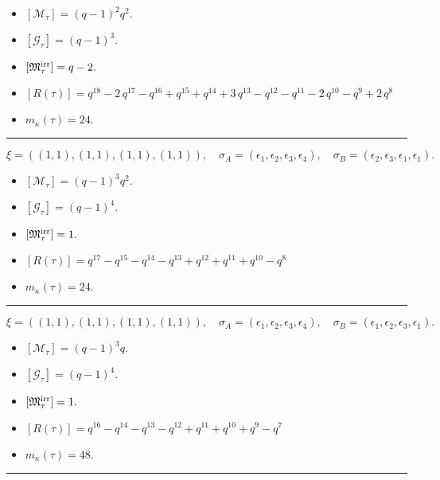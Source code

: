 \documentclass[10pt,a4paper]{amsart}
\begin{document}
\begin{itemize}
 \item $[\mathcal{M}_{\tau}] = {\left(q - 1\right)}^{2} q^{2} .$

 \item $[\mathcal{G}_{\tau}] = {\left(q - 1\right)}^{3} .$

 \item $[{\frak M}_{\tau}^{\textrm{irr}}] = q - 2 .$

 \item $[R(\tau)] = q^{18} - 2 \, q^{17} - q^{16} + q^{15} + q^{14} + 3 \, q^{13} - q^{12} - q^{11} - 2 \, q^{10} - q^{9} + 2 \, q^{8} $

 \item $m_{\kappa}(\tau) = 24 .$

 \end{itemize}
\noindent\rule{8cm}{0.4pt}

$$\xi = ({(1, 1)}, {(1, 1)}, {(1, 1), (1, 1)}),\quad \sigma_A = ({{\epsilon_1}}, {{\epsilon_2}}, {{\epsilon_3}, {\epsilon_4}}),\quad \sigma_B = ({{\epsilon_2}}, {{\epsilon_3}}, {{\epsilon_1}, {\epsilon_1}}).$$

\begin{itemize}
 \item $[\mathcal{M}_{\tau}] = {\left(q - 1\right)}^{3} q^{2} .$

 \item $[\mathcal{G}_{\tau}] = {\left(q - 1\right)}^{4} .$

 \item $[{\frak M}_{\tau}^{\textrm{irr}}] = 1 .$

 \item $[R(\tau)] = q^{17} - q^{15} - q^{14} - q^{13} + q^{12} + q^{11} + q^{10} - q^{8} $

 \item $m_{\kappa}(\tau) = 24 .$

 \end{itemize}
\noindent\rule{8cm}{0.4pt}

$$\xi = ({(1, 1)}, {(1, 1)}, {(1, 1), (1, 1)}),\quad \sigma_A = ({{\epsilon_1}}, {{\epsilon_2}}, {{\epsilon_3}, {\epsilon_4}}),\quad \sigma_B = ({{\epsilon_1}}, {{\epsilon_2}}, {{\epsilon_3}, {\epsilon_1}}).$$

\begin{itemize}
 \item $[\mathcal{M}_{\tau}] = {\left(q - 1\right)}^{3} q .$

 \item $[\mathcal{G}_{\tau}] = {\left(q - 1\right)}^{4} .$

 \item $[{\frak M}_{\tau}^{\textrm{irr}}] = 1 .$

 \item $[R(\tau)] = q^{16} - q^{14} - q^{13} - q^{12} + q^{11} + q^{10} + q^{9} - q^{7} $

 \item $m_{\kappa}(\tau) = 48 .$

 \end{itemize}
\noindent\rule{8cm}{0.4pt}
\end{document}
